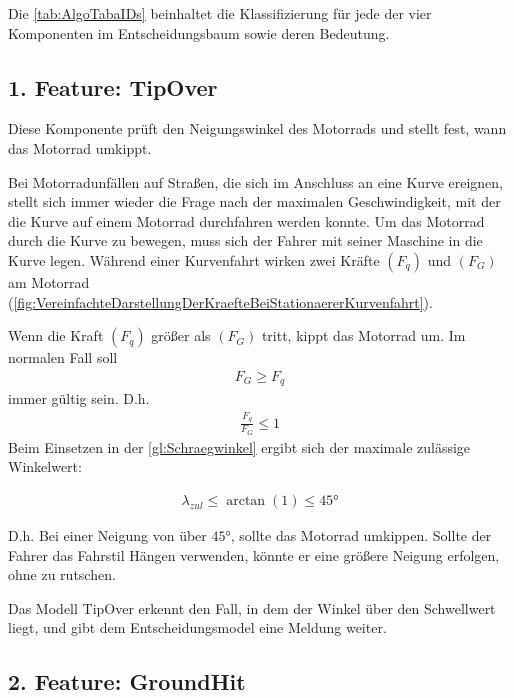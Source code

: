 Die \autoref{tab:AlgoTabaIDs} beinhaltet die Klassifizierung für jede der vier Komponenten im Entscheidungsbaum sowie deren Bedeutung.


\subsection{1. Feature: TipOver}
%
%
%
%
Diese Komponente prüft den Neigungswinkel des Motorrads und stellt fest, wann das Motorrad umkippt.

Bei Motorradunfällen auf Straßen, die sich im Anschluss an eine Kurve ereignen, stellt sich immer wieder die Frage nach der maximalen Geschwindigkeit, mit der die Kurve auf einem Motorrad durchfahren werden konnte.
Um das Motorrad durch die Kurve zu bewegen, muss sich der Fahrer mit seiner Maschine in die Kurve legen. Während einer Kurvenfahrt wirken zwei Kräfte $(F_q)$ und $(F_G)$ am Motorrad (\autoref{fig:VereinfachteDarstellungDerKraefteBeiStationaererKurvenfahrt}).

Wenn die Kraft $(F_q)$ größer als $(F_G)$ tritt, kippt das Motorrad um. Im normalen Fall soll
\begin{align*}
	F_G \geq F_q
\end{align*}
immer gültig sein. D.h. 
\begin{align*}
	\frac{F_q}{F_G} \leq 1
\end{align*}
Beim Einsetzen in der \autoref{gl:Schraegwinkel} ergibt sich der maximale zulässige Winkelwert:

\begin{align*} \lambda_{zul} \leq \arctan(1) \leq \ang{45}\end{align*}

D.h. Bei einer Neigung von über $\ang{45}$, sollte das Motorrad umkippen. Sollte der Fahrer das Fahrstil \glqq Hängen\grqq{} verwenden, könnte er eine größere Neigung erfolgen, ohne zu rutschen.

Das Modell \glqq TipOver\grqq{} erkennt den Fall, in dem der Winkel über den Schwellwert liegt, und gibt dem Entscheidungsmodel eine Meldung weiter.



\subsection{2. Feature: GroundHit}
%
%
%
%

